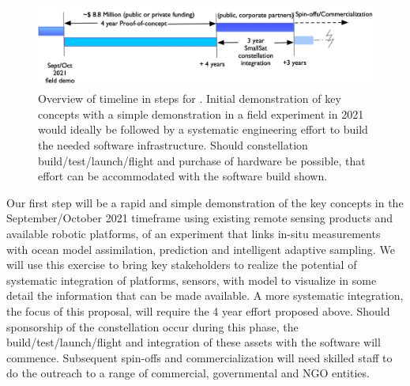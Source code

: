 \begin{figure}[!t]
  \centering
  \includegraphics[scale=0.22]{fig/timeline.jpg}
  \caption{Overview of timeline in steps for \proe. Initial
    demonstration of key concepts with a simple demonstration in a
    field experiment in 2021 would ideally be followed by a systematic
    engineering effort to build the needed software
    infrastructure. Should \sml constellation build/test/launch/flight
    and purchase of hardware be possible, that effort can be
    accommodated with the software build shown.}
  \label{fig:timeline}
\end{figure}

Our first step will be a rapid and simple demonstration of the key
concepts in the September/October 2021 timeframe using existing remote
sensing products and available robotic platforms, of an experiment
that links in-situ measurements with ocean model assimilation,
prediction and intelligent adaptive sampling. We will use this
exercise to bring key stakeholders to realize the potential of
systematic integration of platforms, sensors, with model to visualize
in some detail the information that can be made available. A more
systematic integration, the focus of this proposal, will require the 4
year effort proposed above. Should sponsorship of the \sml
constellation occur during this phase, the build/test/launch/flight
and integration of these assets with the software will
commence. Subsequent spin-offs and commercialization will need skilled
staff to do the outreach to a range of commercial, governmental and
NGO entities.





